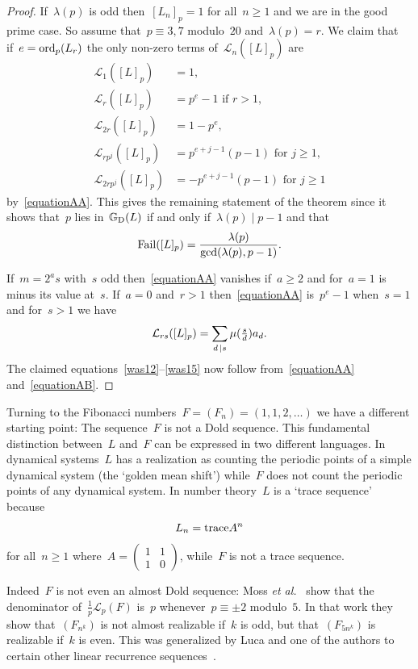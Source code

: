 \documentclass[]{interact}
\theoremstyle{plain}
\numberwithin{equation}{section} %
\numberwithin{table}{section} %
\numberwithin{figure}{section}
\def\gooddoldprimes{\mathbb{G}_{\rm{D}}}
\newcommand\ord{{\rm{ord}}}
\newcommand\failure{{\rm{Fail}}}
\newcommand\least{{\mathcal{L}}}
\newcommand\trace{{\rm{trace}}}
\newcommand\divides\mid
\newcommand\smalldivides{\mathrel{\kern-2pt\kern3.5pt|}}
\def\ge{\geqslant}
\begin{document}
\begin{proof}
If~$\lambda(p)$ is odd then~$[L_n]_p=1$ for all~$n\ge1$
and we are in the good prime case.
So assume that~$p\equiv3,7$ modulo~$20$
and~$\lambda(p)=r$.
We claim that if~$e=\ord_p(L_{r})$ the
only non-zero terms of~$\least_n([L]_p)$ are
\begin{align}
\least_1([L]_p)&=1,\nonumber\\
\least_{r}([L]_p)&=p^e-1\mbox{ if }r>1,\label{was12}\\
\least_{2r}([L]_p)&=1-p^e,\nonumber\\
\least_{rp^j}([L]_p)&=p^{e+j-1}(p-1)\mbox{ for }j\ge1,\nonumber\\
\least_{2rp^j}([L]_p)&=-p^{e+j-1}(p-1)\mbox{ for }j\ge1\label{was15}
\end{align}
by~\eqref{equationAA}.
This gives the remaining statement of the theorem
since it shows that~$p$
lies in~$\gooddoldprimes(L)$
if and only if~$\lambda(p)\divides p-1$ and that
\[
\failure([L]_p)
=
\frac{\lambda(p)}{\gcd(\lambda(p),p-1)}.
\]

If~$m=2^as$ with~$s$ odd then~\eqref{equationAA}
vanishes if~$a\ge2$ and for~$a=1$ is minus
its value at~$s$.
If~$a=0$ and~$r>1$ then~\eqref{equationAA} is~$p^e-1$
when~$s=1$ and for~$s>1$ we have
\begin{equation}\label{equationAB}
\least_{rs}([L]_p)
=
\sum_{d\smalldivides s}\mu(\tfrac{s}{d})a_d.
\end{equation}
The claimed equations~\eqref{was12}--\eqref{was15}
now follow from~\eqref{equationAA} and~\eqref{equationAB}.
\end{proof}

Turning to the Fibonacci numbers~$F=(F_n)=(1,1,2,\dots)$
we have a different starting point: The sequence~$F$ is not a
Dold sequence.
This fundamental distinction between~$L$ and~$F$ can be expressed
in two different languages. In dynamical systems~$L$ has a realization
as counting the periodic points of a simple dynamical
system (the `golden mean shift') while~$F$ does not
count the periodic points of any dynamical system.
In number theory~$L$ is a `trace sequence' because
\[
L_n
=
\trace A^n
\]
for all~$n\ge1$ where~$A=\begin{pmatrix}1&1\\1&0\end{pmatrix}$,
while~$F$ is not a trace sequence.

Indeed~$F$ is not even an almost
Dold sequence: Moss {\it{et al.}}~\cite[Lemma~1]{MR4394356} show that
the denominator of~$\frac{1}{p}\least_p(F)$ is~$p$ whenever~$p\equiv\pm2$ modulo~$5$.
In that work they show that~$(F_{n^k})$ is not almost
realizable if~$k$ is odd, but that~$(F_{5n^k})$ is
realizable if~$k$ is even. This was generalized by
Luca and one of the authors to certain other linear
recurrence sequences~\cite{MR4590321}.
\end{document}
